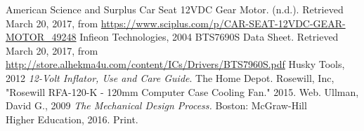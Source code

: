 \documentclass[12pt,letterpaper,titlepage]{article}
\begin{document}
\pagebreak
\begin{thebibliography}{9}
	American Science and Surplus Car Seat 12VDC Gear Motor. (n.d.).  Retrieved March 20, 2017, from \url{https://www.sciplus.com/p/CAR-SEAT-12VDC-GEAR-MOTOR_49248}
	Infieon Technologies, 2004 BTS7690S Data Sheet. Retrieved March 20, 2017, from \\
	 \url{http://store.alhekma4u.com/content/ICs/Drivers/BTS7960S.pdf}
		Husky Tools, 2012 \textit{12-Volt Inflator, Use and Care Guide}. The Home Depot.
		Rosewill, Inc, "Rosewill RFA-120-K - 120mm Computer Case Cooling Fan." 2015. Web. 
		Ullman, David G., 2009 \textit{The Mechanical Design Process.} Boston: McGraw-Hill \\Higher Education, 2016. Print.
    
\end{thebibliography}
 
\end{document}
